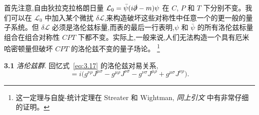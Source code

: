 首先注意,自由狄拉克拉格朗日量 $\mathcal{L}_0 = \bar{\psi}(i\slashed{\partial} - m)\psi$ 在 $C$, $P$ 和 $T$ 下分别不变。我们可以在 $\mathcal{L}_0$ 中加入某个微扰 $\delta\mathcal{L}$,来构造破坏这些对称性中任意一个的更一般的量子系统。但 $\delta\mathcal{L}$ 必须是洛伦兹标量,而表的最后一行表明,$\psi$ 和 $\bar{\psi}$ 的所有洛伦兹标量组合在组合对称性 $CPT$ 下都不变。实际上,一般来说,人们无法构造一个具有厄米哈密顿量但破坏 $CPT$ 的洛伦兹不变的量子场论。%
\footnote{这一定理与自旋-统计定理在 Streater 和 Wightman, \emph{同上引文} 中有非常仔细的证明。}

\problems

\textbf{3.1} \emph{洛伦兹群}.  回忆式~\eqref{eq:3.17} 的洛伦兹对易关系,
\begin{equation}
  [J^{\mu\nu}, J^{\rho\sigma}] = i\bigl( g^{\nu\rho}J^{\mu\sigma}
    - g^{\mu\rho}J^{\nu\sigma} - g^{\nu\sigma}J^{\mu\rho}
    + g^{\mu\sigma}J^{\nu\rho} \bigr).
\end{equation}
